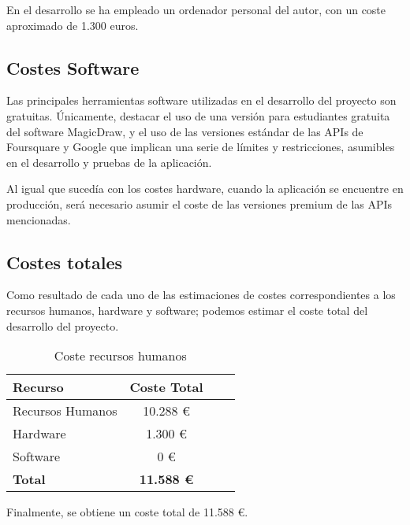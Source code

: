 En el desarrollo se ha empleado un ordenador personal del autor, con un coste aproximado de 1.300 euros.


\subsection{Costes Software}
Las principales herramientas software utilizadas en el desarrollo del proyecto son gratuitas. Únicamente, destacar el uso de una versión para estudiantes gratuita del software MagicDraw, y el uso de las versiones estándar de las APIs de Foursquare y Google que implican una serie de límites y restricciones, asumibles en el desarrollo y pruebas de la aplicación. 

Al igual que sucedía con los costes hardware, cuando la aplicación se encuentre en producción, será necesario asumir el coste de las versiones premium de las APIs mencionadas.


\subsection{Costes totales}
Como resultado de cada uno de las estimaciones de costes correspondientes a los recursos humanos, hardware y software; podemos estimar el coste total del desarrollo del proyecto.

\begin{table}[H]
\centering
\begin{tabular}{|l|c|c|c|}
\hline
\textbf{Recurso} & \textbf{Coste Total} \\ \hline
Recursos Humanos &  10.288 € \\ \hline
Hardware & 1.300 €  \\ \hline
Software & 0 €  \\ \hline
\textbf{Total} & \textbf{11.588 €} \\ \hline
\end{tabular}
\caption{Coste recursos humanos}
\end{table}

Finalmente, se obtiene un coste total de 11.588 €.
